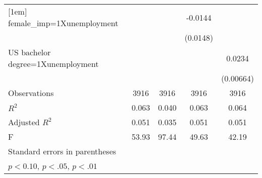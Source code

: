 {\begin{tabular}{l*{4}{c}}
[1em]
female\_imp=1Xunemployment&                     &                     &     -0.0144         &                     \\
                    &                     &                     &    (0.0148)         &                     \\
[1em]
US bachelor degree=1Xunemployment&                     &                     &                     &      0.0234\sym{***}\\
                    &                     &                     &                     &   (0.00664)         \\
\hline
Observations        &        3916         &        3916         &        3916         &        3916         \\
\(R^{2}\)           &       0.063         &       0.040         &       0.063         &       0.064         \\
Adjusted \(R^{2}\)  &       0.051         &       0.035         &       0.051         &       0.051         \\
F                   &       53.93         &       97.44         &       49.63         &       42.19         \\
\hline\hline
\multicolumn{5}{l}{\footnotesize Standard errors in parentheses}\\
\multicolumn{5}{l}{\footnotesize \sym{*} \(p<0.10\), \sym{**} \(p<.05\), \sym{***} \(p<.01\)}\\
\end{tabular}
}
